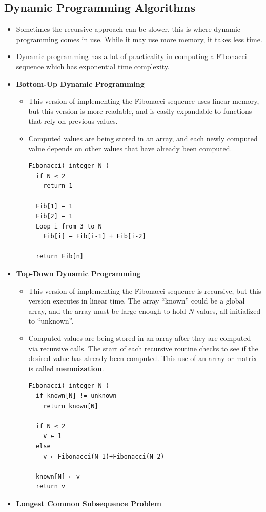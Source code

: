 \documentclass{article}
\begin{document}
\subsection*{Dynamic Programming Algorithms}
\begin{itemize}
    \item Sometimes the recursive approach can be slower, this is where dynamic programming comes in use. While it may use more memory, it takes less time.
    \item Dynamic programming has a lot of practicality in computing a Fibonacci sequence which has exponential time complexity.
    \item \textbf{Bottom-Up Dynamic Programming}
    \begin{itemize}
        \item This version of implementing the Fibonacci sequence uses linear memory, but this version is more readable, and is easily expandable to functions that rely on previous values.
        \item Computed values are being stored in an array, and each newly computed value depends on other values that have already been computed.
\begin{verbatim}
Fibonacci( integer N )
  if N ≤ 2
    return 1
 
  Fib[1] ← 1
  Fib[2] ← 1
  Loop i from 3 to N
    Fib[i] ← Fib[i-1] + Fib[i-2]
 
  return Fib[n]
\end{verbatim}
    \end{itemize}
    \item \textbf{Top-Down Dynamic Programming}
    \begin{itemize}
        \item This version of implementing the Fibonacci sequence is recursive, but this version executes in linear time. The array ``known'' could be a global array, and the array must be large enough to hold \(N\) values, all initialized to ``unknown''.
        \item Computed values are being stored in an array after they are computed via recursive calls. The start of each recursive routine checks to see if the desired value has already been computed. This use of an array or matrix is called \textbf{memoization}.
\begin{verbatim}
Fibonacci( integer N )
  if known[N] != unknown
    return known[N]
 
  if N ≤ 2
    v ← 1
  else
    v ← Fibonacci(N-1)+Fibonacci(N-2)
 
  known[N] ← v
  return v
\end{verbatim}
    \end{itemize}
    \item \textbf{Longest Common Subsequence Problem}

\end{itemize}
\end{document}
